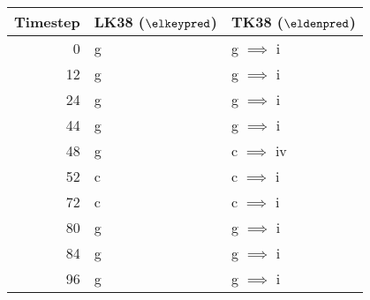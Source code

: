 \begin{tabular}{r|ll}
Timestep       & LK38 ($\elkeypred$) & TK38 ($\eldenpred$)  \\ \hline
0              & g                   & g $\implies$ i       \\
12             & g                   & g $\implies$ i       \\
24             & g                   & g $\implies$ i       \\
44             & g                   & g $\implies$ i       \\ \hline
48             & g                   & c $\implies$ iv      \\
52             & c                   & c $\implies$ i       \\
72             & c                   & c $\implies$ i       \\
80             & g                   & g $\implies$ i       \\
84             & g                   & g $\implies$ i       \\
96             & g                   & g $\implies$ i       \\
\end{tabular}
    
